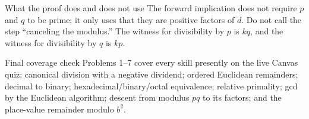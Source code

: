 \documentclass[10pt]{article}
\begin{document}
\begin{warningbox}{What the proof does and does not use}
The forward implication does not require $p$ and $q$ to be prime; it only uses
that they are positive factors of $d$. Do not call the step ``canceling the modulus.''
The witness for divisibility by $p$ is $kq$, and the witness for divisibility
by $q$ is $kp$.
\end{warningbox}

\begin{goalbox}{Final coverage check}
Problems 1--7 cover every skill presently on the live Canvas quiz: canonical
division with a negative dividend; ordered Euclidean remainders; decimal to
binary; hexadecimal/binary/octal equivalence; relative primality; gcd by the
Euclidean algorithm; descent from modulus $pq$ to its factors; and the
place-value remainder modulo $b^2$.
\end{goalbox}

\thispagestyle{fancy}
\end{document}
